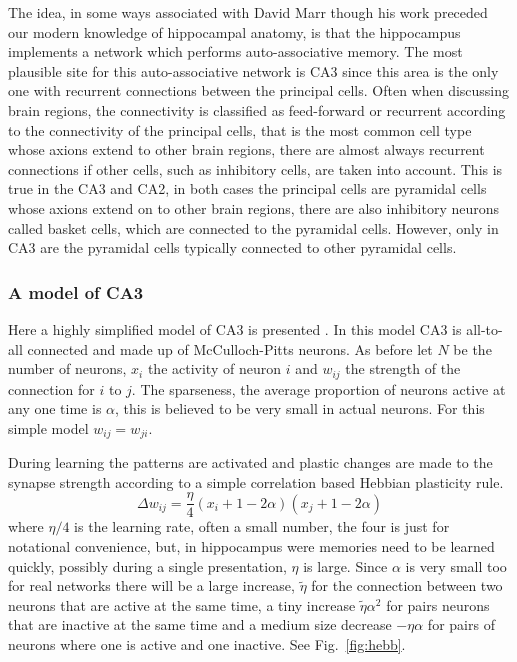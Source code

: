 \documentclass[12pt]{article}
\begin{document}
The idea, in some ways associated with David Marr though his work
preceded our modern knowledge of hippocampal anatomy, is that the
hippocampus implements a network which performs auto-associative
memory. The most plausible site for this auto-associative network is
CA3 since this area is the only one with recurrent connections between
the principal cells. Often when discussing brain regions, the
connectivity is classified as feed-forward or recurrent according to
the connectivity of the principal cells, that is the most common cell
type whose axions extend to other brain regions, there are almost
always recurrent connections if other cells, such as inhibitory cells,
are taken into account. This is true in the CA3 and CA2, in both cases
the principal cells are pyramidal cells whose axions extend on to
other brain regions, there are also inhibitory neurons called basket
cells, which are connected to the pyramidal cells. However, only in
CA3 are the pyramidal cells typically connected to other pyramidal
cells.

\subsubsection*{A model of CA3}
Here a highly simplified model of CA3 is presented
\cite{Amit1992a}. In this model CA3 is all-to-all connected and made
up of McCulloch-Pitts neurons. As before let $N$ be the number
of neurons, $x_i$ the activity of neuron $i$ and $w_{ij}$ the strength
of the connection for $i$ to $j$. The sparseness, the average
proportion of neurons active at any one time is $\alpha$, this is believed
to be very small in actual neurons. For this simple model $w_{ij}=w_{ji}$.

During learning the patterns are activated and plastic changes are
made to the synapse strength according to a simple correlation based Hebbian plasticity rule.
\begin{equation}
\Delta w_{ij}=\frac{\eta}{4} (x_i+1-2\alpha)(x_j+1-2\alpha)
\end{equation}
where $\eta/4$ is the learning rate, often a small number, the four is
just for notational convenience, but, in hippocampus were memories
need to be learned quickly, possibly during a single presentation,
$\eta$ is large. Since $\alpha$ is very small too for real networks
there will be a large increase, $\tilde \eta$ for the connection
between two neurons that are active at the same time, a tiny increase
$\tilde \eta\alpha^2$ for pairs neurons that are inactive at the same
time and a medium size decrease $-\eta \alpha $ for pairs of neurons where one is
active and one inactive. See Fig.~\ref{fig:hebb}.
\end{document}
